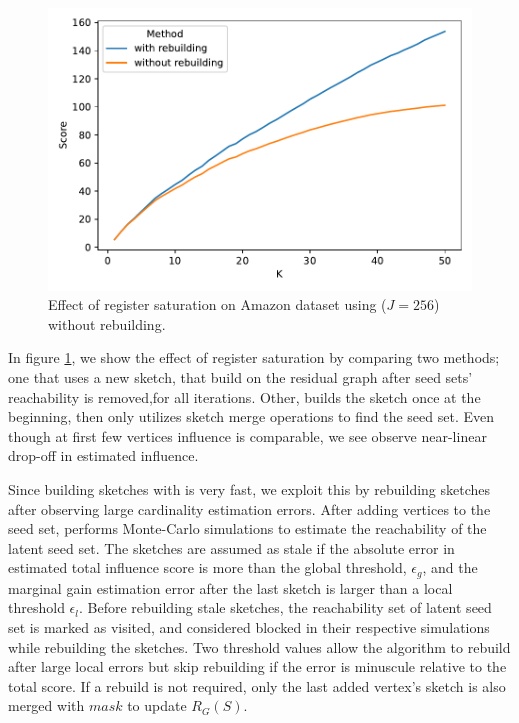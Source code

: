 \documentclass[10pt,journal,compsoc]{IEEEtran}
\newcommand\acro{{\sc{HyperFuseR\xspace}\xspace}\xspace}
\begin{document}
\begin{figure}[!ht]
    \begin{center}
    \includegraphics[width=\linewidth]{images/sketch-saturation.pdf}
    \caption{ Effect of register saturation on Amazon dataset using \acro($J=256$) without rebuilding.
     }\label{fig:sketch-saturation} 
    \end{center}
\end{figure}

In figure \ref{fig:sketch-saturation}, we show the effect of register saturation by comparing two methods; one that uses a new sketch, that build on the residual graph after seed sets' reachability is removed,for all iterations. Other, builds the sketch once at the beginning, then only utilizes sketch merge operations to find the seed set. 
Even though at first few vertices influence is comparable, we see observe near-linear drop-off in estimated influence.
    

Since building sketches with \acro is very fast, we exploit this by rebuilding sketches after observing large cardinality estimation errors.
After adding vertices to the seed set, \acro performs Monte-Carlo simulations to estimate the reachability of the latent seed set.
The sketches are assumed as stale if the absolute error in estimated total influence score is more than the global threshold, $\epsilon_{g}$, 
and the marginal gain estimation error after the last sketch is larger than a local threshold $\epsilon_{l}$. 
Before rebuilding stale sketches, the reachability set of latent seed set is marked as visited, 
and considered blocked in their respective simulations while rebuilding the sketches. 
Two threshold values allow the algorithm to rebuild after large local errors but skip rebuilding if the error is minuscule relative to the total score. 
If a rebuild is not required, only the last added vertex's sketch is also merged with $mask$ to update $R_G(S)$.
\end{document}
